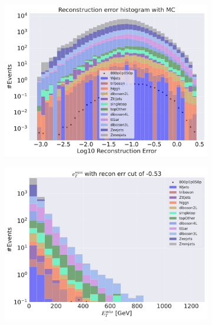 \begin{figure}[H]
    \centering
    \begin{subfigure}{.49\textwidth}
        \includegraphics[width=\textwidth]{Figures/VAE_testing/big/3lep/b_data_recon_big_rm3_feats_sig_800p0p050p.pdf}
        \caption{ }
        \label{fig:VAE_3lep_big_800_3}
    \end{subfigure}
    \hfill
    \begin{subfigure}{.49\textwidth}
        \includegraphics[width=\textwidth]{Figures/VAE_testing/big/3lep/b_data_recon_big_rm3_feats_sig_800p0p050p_etmiss_recon_errcut_-0.53.pdf}
        \caption{}
        \label{fig:VAE_3lep_big_etmiss_800_3}
    \end{subfigure}

\end{figure}
